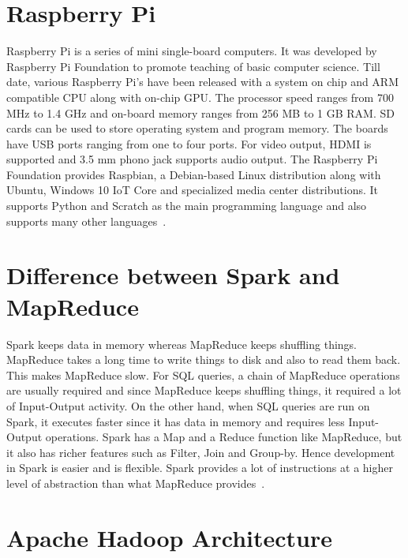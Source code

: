 \section{Raspberry Pi}

Raspberry Pi is a series of mini single-board computers. 
It was developed by Raspberry Pi Foundation to promote teaching of basic 
computer science. Till date, various Raspberry Pi's have been released with a 
system on chip and ARM compatible CPU along with on-chip GPU.   The processor 
speed ranges from 700 MHz to 1.4 GHz and on-board memory ranges from 256 MB to 
1 GB RAM. SD cards can be used to store operating system and program memory. The
boards have USB ports ranging from one to four ports. For video output, HDMI is 
supported and 3.5 mm phono jack supports audio output. The Raspberry Pi 
Foundation provides Raspbian, a Debian-based Linux distribution along with 
Ubuntu, Windows 10 IoT Core and specialized media center distributions. It 
supports Python and Scratch as the main programming language and also supports 
many other languages~\cite{hid-sp18-408-Raspberry-Pi}.

\section{Difference between Spark and MapReduce}

Spark keeps data in memory whereas MapReduce keeps shuffling things. MapReduce 
takes a long time to write things to disk and also to read them back. This makes
MapReduce slow. For SQL queries, a chain of MapReduce operations are usually 
required and since MapReduce keeps shuffling things, it required a lot of 
Input-Output activity. On the other hand, when SQL queries are run on Spark, it 
executes faster since it has data in memory and requires less Input-Output 
operations. Spark has a Map and a Reduce function like MapReduce, but it also 
has richer features such as Filter, Join and Group-by. Hence development in 
Spark is easier and is flexible. Spark provides a lot of instructions at a 
higher level of abstraction than what MapReduce provides~\cite{hid-sp18-408-Difference}.

\section{Apache Hadoop Architecture}

